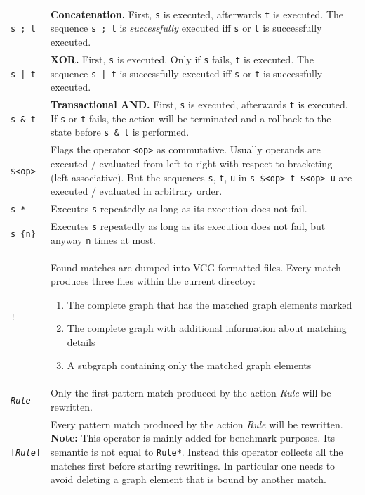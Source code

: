\begin{table}[htbp]
\begin{minipage}{\linewidth} \renewcommand{\footnoterule}{} 
\begin{tabularx}{\linewidth}{|lX|}
\hline
\texttt{s ; t}		& \textbf{Concatenation.} First, \texttt{s} is executed, afterwards \texttt{t} is executed. The sequence \texttt{s ; t} is \emph{successfully} executed iff \texttt{s} or \texttt{t} is successfully executed.\\
\texttt{s | t}		& \textbf{XOR.} First, \texttt{s} is executed. Only if \texttt{s} fails, \texttt{t} is executed. The sequence \texttt{s | t} is successfully executed iff \texttt{s} or \texttt{t} is successfully executed.\\
\texttt{s \& t}	& \textbf{Transactional AND.} First, \texttt{s} is executed, afterwards \texttt{t} is executed. If \texttt{s} or \texttt{t} fails, the action will be terminated and a rollback to the state before \texttt{s \& t} is performed.\\
\texttt{\$<op>}	& Flags the operator \texttt{<op>} as commutative. Usually operands are executed / evaluated from left to right with respect to bracketing (left-associative). But the sequences \texttt{s}, \texttt{t}, \texttt{u} in \texttt{s \$<op> t \$<op> u} are executed / evaluated in arbitrary order. \\
\texttt{s *}		& Executes \texttt{s} repeatedly as long as its execution does not fail.\\
\texttt{s \{n\}}	& Executes \texttt{s} repeatedly as long as its execution does not fail, but anyway \texttt{n} times at most.\\
\texttt{!}		& Found matches are dumped into VCG formatted files. Every match produces three files within the current directoy:
\begin{enumerate}
  \item The complete graph that has the matched graph elements marked
  \item The complete graph with additional information about matching details
  \item A subgraph containing only the matched graph elements
\end{enumerate}\\
\texttt{\emph{Rule}} & Only the first pattern match produced by the action \emph{Rule} will be rewritten.\\
\texttt{[\emph{Rule}]} & Every pattern match produced by the action \emph{Rule} will be rewritten. \textbf{Note:} This operator is mainly added for benchmark purposes. Its semantic is not equal to \texttt{Rule*}. Instead this operator collects all the matches first before starting rewritings. In particular one needs to avoid deleting a graph element that is bound by another match. \\

\end{tabularx}
\end{minipage}
\end{table}
